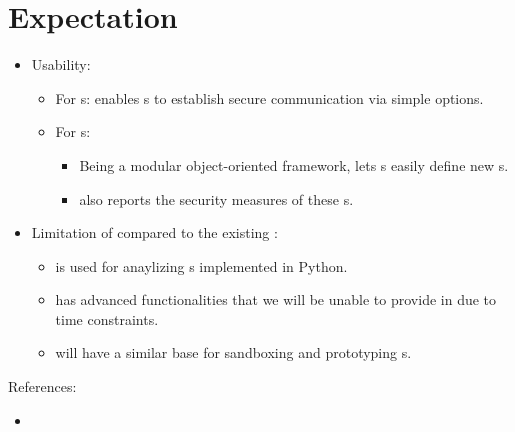 
\section{Expectation}

\begin{itemize}
\item Usability:
  \begin{itemize}
  \item For \eu s: \cry{} enables \eu s to establish
    secure communication via simple \cl{} options.
  \item For \cg s:
    \begin{itemize}
    \item Being a modular object-oriented framework,
      \cry{} lets \cg s easily define new \cs s.
    \item \cry{} also reports the security measures
      of these \cs s.
    \end{itemize}
\end{itemize}
\item Limitation of \cry{} compared to
  the existing \charm{} \cf:
  \begin{itemize}
  \item \charm{} is used for anaylizing \cs s
    implemented in Python.
  \item \charm{} has advanced functionalities
    that we will be unable to provide in \cry{}
    due to time constraints.
  \item \cry{} will have a similar base for sandboxing
    and prototyping \cs s.
  \end{itemize}
\end{itemize}


References:
\begin{itemize}
\item \cite{charm}
\end{itemize}
